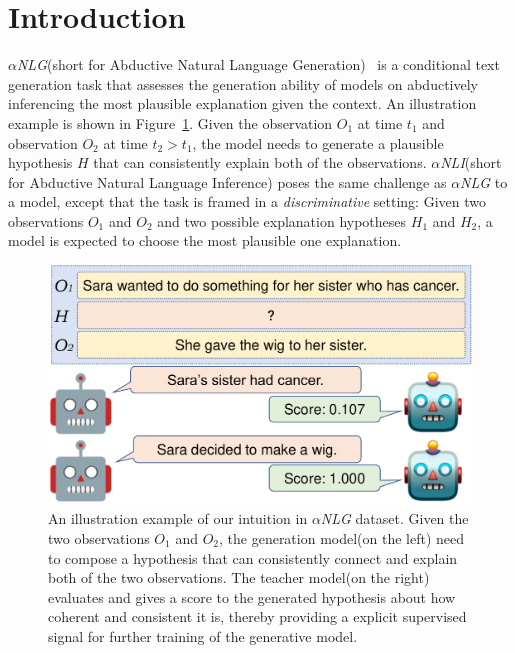 \section{Introduction}
$\alpha$\textit{NLG}(short for Abductive Natural Language Generation)~\citep{Bhagavatula2020Abductive} 
is a conditional text generation task that
assesses the generation ability of models on abductively inferencing the most plausible explanation given the context.
An illustration example is shown in Figure~\ref{fig:intro_example}. Given the observation
$O_1$ at time $t_1$ and observation $O_2$ at time $t_2 > t_1$, the model needs to generate a
plausible hypothesis $H$ that can consistently explain both of the observations.
$\alpha$\textit{NLI}(short for Abductive Natural Language Inference) poses the same challenge as $\alpha$\textit{NLG} to
a model, except that the task is framed in a \textit{discriminative} setting: Given two observations $O_1$ and $O_2$ 
and two possible explanation hypotheses $H_1$ and $H_2$, a model is expected to choose the most plausible one explanation. %

\begin{figure}[t]
    \centering
    \includegraphics[width=1.0\columnwidth]{figs/intro_example.pdf}
    \caption{An illustration example of our intuition in $\alpha$\textit{NLG} dataset. Given the two observations
        $O_1$ and $O_2$, the generation model(on the left) need to compose a hypothesis that can consistently
        connect and explain both of the two observations. The teacher model(on the right)
        evaluates and gives a score to the generated hypothesis about how coherent and consistent it 
        is, thereby providing a explicit supervised signal for further training of the generative model.
    }
    \label{fig:intro_example}
\end{figure}

